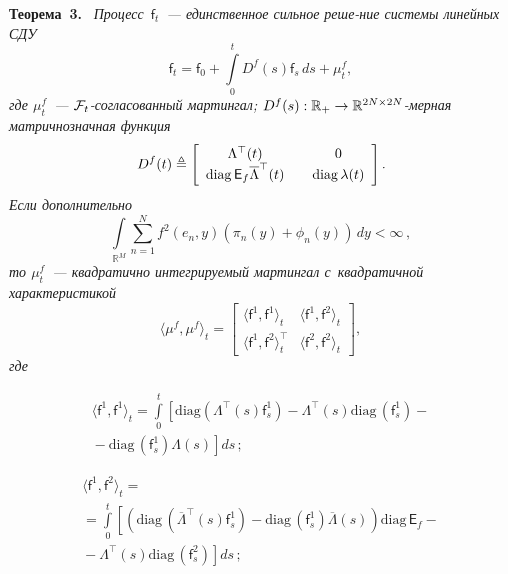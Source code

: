 \begin{multicols}{2}
\noindent
\textbf{Теорема~3.}\
\textit{Процесс~$\mathsf{f}_t$~--- единственное сильное реше-}\linebreak \textit{ние системы линейных СДУ}
\begin{equation}
\mathsf{f}_t = \mathsf{f}_0 + \int\limits_0^t D^f(s)\mathsf{f}_s\,ds + \mu_t^f,
\label{eq:sys_3}
\end{equation}
\textit{где $\mu_t^f$~--- ${\mathcal F}_t$-со\-гла\-со\-ван\-ный мартингал; $D^f(s): \mathbb{R}_+ \hm\to 
\mathbb{R}^{2N \times 2N}$-мер\-ная матричнозначная функция}
$$
D^f(t) \triangleq \left[
\begin{array}{ccc}
\Lambda^{\top}(t) & & 0\\
 \mathrm{diag}\, {\mathsf E}_f {\overline{\Lambda}}^{\top}(t)  & &  \mathrm{diag}\,\lambda(t)
\end{array}
\right].
$$
\textit{Если дополнительно}
\begin{equation}
\int\limits_{\mathbb{R}^M}\sum\limits_{n=1}^Nf^2(e_n, y)(\pi_n(y)+\phi_n(y))\,dy < \infty\,,
\label{eq:cond_1}
\end{equation}
\textit{то $\mu_t^f$~--- квадратично интегрируемый мартингал с~квадратичной 
характеристикой}
$$
\langle \mu^f, \mu^f \rangle_t = \left[ 
\begin{array}{cc}
\langle \mathsf{f}^1, \mathsf{f}^1 \rangle_t & \langle \mathsf{f}^1, 
\mathsf{f}^2 \rangle_t \\
\langle \mathsf{f}^1, \mathsf{f}^2 \rangle_t^{\top} & \langle \mathsf{f}^2, 
\mathsf{f}^2 \rangle_t
\end{array}
\right],
$$
\textit{где}

\vspace*{-4pt}

\noindent
\begin{multline}
\langle \mathsf{f}^1, \mathsf{f}^1 \rangle_t =\int\limits_0^t \left[
\mathrm{diag}\left( \Lambda^{\top}(s)\mathsf{f}^1_s\right)-  
\Lambda^{\top}(s)\mathrm{diag}\,(\mathsf{f}^1_s) - {}\right.\\
\left.{}-\mathrm{diag}\,(\mathsf{f}^1_s)\Lambda(s)
\right]ds\,;
\label{eq:sc_11}
\end{multline}

\vspace*{-12pt}

\noindent
\begin{multline}
\langle \mathsf{f}^1, \mathsf{f}^2 \rangle_t={}\\
{}=
\int\limits _0^t \left[
\left(\mathrm{diag}\,( \overline{\Lambda}^{\top}(s)\mathsf{f}^1_s) -   
\mathrm{diag}\,(\mathsf{f}^1_s) \overline{\Lambda}(s)
\right)\mathrm{diag}\, {\mathsf E}_f-{}\right.\\
\left.{}
- \Lambda^{\top}(s) \mathrm{diag}\,(\mathsf{f}^2_s) \right]ds\,;
\label{eq:sc_12}
\end{multline}


\end{multicols}
